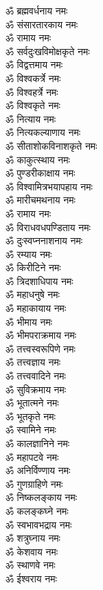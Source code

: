 \begin{multicols}{2}
\begin{flushleft}
ॐ ब्रह्मवर्धनाय नमः\\
ॐ संसारतारकाय नमः\\
ॐ रामाय नमः\\
ॐ सर्वदुःखविमोक्षकृते नमः\\
ॐ विद्वत्तमाय नमः\\
ॐ विश्वकर्त्रे नमः\\
ॐ विश्वहर्त्रे नमः\\
ॐ विश्वकृते नमः\\
ॐ नित्याय नमः\hfill{}\\
ॐ नित्यकल्याणाय नमः\\
ॐ सीताशोकविनाशकृते नमः\\
ॐ काकुत्स्थाय नमः\\
ॐ पुण्डरीकाक्षाय नमः\\
ॐ विश्वामित्रभयापहाय नमः\\
ॐ मारीचमथनाय नमः\\
ॐ रामाय नमः\\
ॐ विराधवधपण्डिताय नमः\\
ॐ दुःस्वप्ननाशनाय नमः\\
ॐ रम्याय नमः\hfill{}\\
ॐ किरीटिने नमः\\
ॐ त्रिदशाधिपाय नमः\\
ॐ महाधनुषे नमः\\
ॐ महाकायाय नमः\\
ॐ भीमाय नमः\\
ॐ भीमपराक्रमाय नमः\\
ॐ तत्त्वस्वरूपिणे नमः\\
ॐ तत्त्वज्ञाय नमः\\
ॐ तत्त्ववादिने नमः\\
ॐ सुविक्रमाय नमः\hfill{}\\
ॐ भूतात्मने नमः\\
ॐ भूतकृते नमः\\
ॐ स्वामिने नमः\\
ॐ कालज्ञानिने नमः\\
ॐ महापटवे नमः\\
ॐ अनिर्विण्णाय नमः\\
ॐ गुणग्राहिणे नमः\\
ॐ निष्कलङ्काय नमः\\
ॐ कलङ्कघ्ने नमः\\
ॐ स्वभावभद्राय नमः\hfill{}\\
ॐ शत्रुघ्नाय नमः\\
ॐ केशवाय नमः\\
ॐ स्थाणवे नमः\\
ॐ ईश्वराय नमः\\

\end{flushleft}
\end{multicols}
